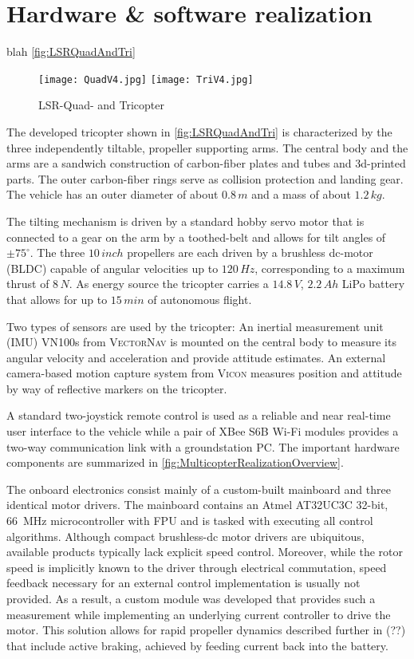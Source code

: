 \section{Hardware \& software realization}
blah \autoref{fig:LSRQuadAndTri}

\begin{figure}[ht]
 \centering
 \texttt{[image: QuadV4.jpg]}
 \hspace{.05\linewidth}
 \texttt{[image: TriV4.jpg]}
 \caption{LSR-Quad- and Tricopter}
 \label{fig:LSRQuadAndTri}
\end{figure}

The developed tricopter shown in \autoref{fig:LSRQuadAndTri} is characterized by the three independently tiltable, propeller supporting arms.
The central body and the arms are a sandwich construction of carbon-fiber plates and tubes and 3d-printed parts.
The outer carbon-fiber rings serve as collision protection and landing gear.
The vehicle has an outer diameter of about $0.8\,\unit{m}$ and a mass of about $1.2\,\unit{kg}$.

The tilting mechanism is driven by a standard hobby servo motor that is connected to a gear on the arm by a toothed-belt and allows for tilt angles of $\pm 75^\circ$.
The three $10\,\unit{inch}$ propellers are each driven by a brushless dc-motor (BLDC) capable of angular velocities up to $120\,\unit{Hz}$, corresponding to a maximum thrust of $8\,\unit{N}$.
As energy source the tricopter carries a $14.8\,\unit{V}$, $2.2\,\unit{Ah}$ LiPo battery that allows for up to $15\,\unit{min}$ of autonomous flight.

Two types of sensors are used by the tricopter:
An inertial measurement unit (IMU) VN100s from \textsc{VectorNav} is mounted on the central body to measure its angular velocity and acceleration and provide attitude estimates.
An external camera-based motion capture system from \textsc{Vicon} measures position and attitude by way of reflective markers on the tricopter.

A standard two-joystick remote control is used as a reliable and near real-time user interface to the vehicle while a pair of XBee S6B Wi-Fi modules provides a two-way communication link with a groundstation PC.
The important hardware components are summarized in \autoref{fig:MulticopterRealizationOverview}.

The onboard electronics consist mainly of a custom-built mainboard and three identical motor drivers. The mainboard contains an Atmel AT32UC3C 32-bit, 66~\unit{MHz} microcontroller with FPU and is tasked with executing all control algorithms.
Although compact brushless-dc motor drivers are ubiquitous, available products typically lack explicit speed control. 
Moreover, while the rotor speed is implicitly known to the driver through electrical commutation, speed feedback necessary for an external control implementation is usually not provided. 
As a result, a custom module was developed that provides such a measurement while implementing an underlying current controller to drive the motor. 
This solution allows for rapid propeller dynamics described further in (??) that include active braking, achieved by feeding current back into the battery.


